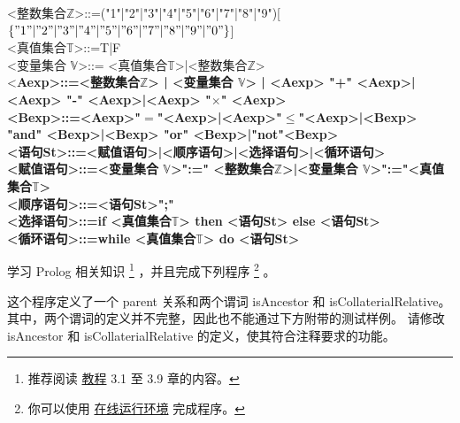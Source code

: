 \documentclass[a4paper, justified]{tufte-handout}
\begin{document}
\begin{solution}

  \noindent <整数集合$\mathbb{Z}$>::=("1"|"2"|"3"|"4"|"5"|"6"|"7"|"8"|"9")[$\left\{"1"|"2"|"3"|"4"|"5"|"6"|"7"|"8"|"9"|"0"\right\}$] \\

  \noindent <真值集合$\mathbb{T}$>::=T|F\\

  \noindent<变量集合 $\mathbb{V}$>::= <真值集合$\mathbb{T}$>|<整数集合$\mathbb{Z}$>\\

  \noindent<\bf Aexp>::=<整数集合$\mathbb{Z}$> | <变量集合 $\mathbb{V}$> | <Aexp> "+" <Aexp>|<Aexp> "-" <Aexp>|<Aexp> "$\times$" <Aexp>\\

  \noindent <\bf Bexp>::=<Aexp>"$=$"<Aexp>|<Aexp>"$\le$"<Aexp>|<Bexp> "and" <Bexp>|<Bexp> "or" <Bexp>|"not"<Bexp>\\

  \noindent <语句\bf St>::=<赋值语句>|<顺序语句>|<选择语句>|<循环语句>\\

  \noindent <赋值语句>::=<变量集合 $\mathbb{V}$>":=" <整数集合$\mathbb{Z}$>|<变量集合 $\mathbb{V}$>":="<真值集合$\mathbb{T}$>\\

  \noindent <顺序语句>::=<语句\bf St>";"\\

  \noindent <选择语句>::=if <真值集合$\mathbb{T}$> then <语句\bf St> else <语句\bf St>\\

  \noindent <循环语句>::=while <真值集合$\mathbb{T}$> do <语句\bf St>\\

\end{solution}


\begin{problem}
学习 Prolog 相关知识
\footnote{推荐阅读 \href{https://zhzluke96.github.io/prolog-tut-cn/tut/chapter1.html}{教程} 3.1 至 3.9 章的内容。}
，并且完成下列程序
\footnote{你可以使用 \href{https://swish.swi-prolog.org}{在线运行环境} 完成程序。}
。

这个程序定义了一个 parent 关系和两个谓词 isAncestor 和 isCollaterialRelative。
其中，两个谓词的定义并不完整，因此也不能通过下方附带的测试样例。
请修改 isAncestor 和 isCollaterialRelative 的定义，使其符合注释要求的功能。


\end{problem}
\end{document}
